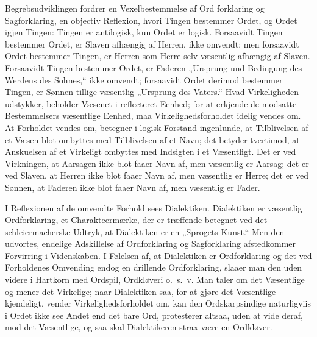 \documentclass[12pt]{book}
\newcommand{\opage}[1]{\marginnote{\footnotesize\textit{[#1]}}}
\begin{document}
Begrebsudviklingen fordrer en Vexelbestemmelse af Ord\opage{7}%
forklaring og Sagforklaring, en objectiv Reflexion, hvori Tingen bestemmer Ordet, og Ordet igjen Tingen: Tingen er antilogisk, kun Ordet er logisk. Forsaavidt Tingen bestemmer Ordet, er Slaven afhængig af Herren, ikke omvendt; men forsaavidt Ordet bestemmer Tingen, er Herren som Herre selv væsentlig afhængig af Slaven. Forsaavidt Tingen bestemmer Ordet, er Faderen „Ursprung und Bedingung des Werdens des Sohnes,“ ikke omvendt; forsaavidt Ordet derimod bestemmer Tingen, er Sønnen tillige væsentlig „Ursprung des Vaters.“ Hvad Virkeligheden udstykker, beholder Væsenet i reflecteret Eenhed; for at erkjende de modsatte Bestemmelsers væsentlige Eenhed, maa Virkelighedsforholdet idelig vendes om. At Forholdet vendes om, betegner i logisk Forstand ingenlunde, at Tilblivelsen af et Væsen blot ombyttes med Tilblivelsen af et Navn; det betyder tvertimod, at Anskuelsen af et Virkeligt ombyttes med Indsigten i et Væsentligt. Det er ved Virkningen, at Aarsagen ikke blot faaer Navn af, men væsentlig er Aarsag; det er ved Slaven, at Herren ikke blot faaer Navn af, men væsentlig er Herre; det er ved Sønnen, at Faderen ikke blot faaer Navn af, men væsentlig er Fader.

I Reflexionen af de omvendte Forhold sees Dialektiken. Dialektiken er væsentlig Ordforklaring, et Charakteermærke, der er træffende betegnet ved det schleiermacherske Udtryk, at Dialektiken er en „Sprogets Kunst.“ Men den udvortes, endelige Adskillelse af Ordforklaring og Sagforklaring afstedkommer Forvirring i Videnskaben. I Følelsen af, at Dialektiken er Ordforklaring og det ved Forholdenes Omvending endog en drillende Ordforklaring, slaaer man den uden videre i Hartkorn med Ordspil, Ordkløveri o.\ s.\ v. Man taler om det Væsentlige og mener det Virkelige; naar Dialektiken saa, for at gjøre det Væsentlige kjendeligt, vender Virkelighedsforholdet om, kan den Ordskarpsindige naturligviis i Ordet ikke see Andet end det bare Ord, protesterer altsaa,
\opage{8}uden at vide deraf, mod det Væsentlige, og saa skal Dialektikeren strax være en Ordkløver.
\end{document}
